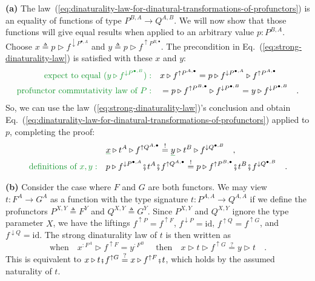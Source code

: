 \textbf{(a)} The law~(\ref{eq:dinaturality-law-for-dinatural-transformations-of-profunctors})
is an equality of functions of type $P^{B,A}\rightarrow Q^{A,B}$.
We will now show that those functions will give equal results when
applied to an arbitrary value $p:P^{B,A}$. Choose $x\triangleq p\triangleright f^{\downarrow P^{\bullet,A}}$
and $y\triangleq p\triangleright f^{\uparrow P^{B,\bullet}}$. The
precondition in Eq.~(\ref{eq:strong-dinaturality-law}) is satisfied
with these $x$ and $y$:
\begin{align*}
{\color{greenunder}\text{expect to equal }(y\triangleright f^{\downarrow P^{\bullet,B}}):}\quad & x\triangleright f^{\uparrow P^{A,\bullet}}=p\triangleright f^{\downarrow P^{\bullet,A}}\triangleright f^{\uparrow P^{A,\bullet}}\\
{\color{greenunder}\text{profunctor commutativity law of }P:}\quad & =p\triangleright f^{\uparrow P^{B,\bullet}}\triangleright f^{\downarrow P^{\bullet,B}}=y\triangleright f^{\downarrow P^{\bullet,B}}\quad.
\end{align*}
So, we can use the law~(\ref{eq:strong-dinaturality-law})\textsf{'}s conclusion
and obtain Eq.~(\ref{eq:dinaturality-law-for-dinatural-transformations-of-profunctors})
applied to $p$, completing the proof:
\begin{align*}
 & \gunderline x\triangleright t^{A}\triangleright f^{\uparrow Q^{A,\bullet}}\overset{!}{=}\gunderline y\triangleright t^{B}\triangleright f^{\downarrow Q^{\bullet,B}}\quad,\\
{\color{greenunder}\text{definitions of }x,y:}\quad & p\triangleright f^{\downarrow P^{\bullet,A}}\bef t^{A}\bef f^{\uparrow Q^{A,\bullet}}\overset{!}{=}p\triangleright f^{\uparrow P^{B,\bullet}}\bef t^{B}\bef f^{\downarrow Q^{\bullet,B}}\quad.
\end{align*}

\textbf{(b)} Consider the case where $F$ and $G$ are both functors.
We may view $t:F^{A}\rightarrow G^{A}$ as a function with the type
signature $t:P^{A,A}\rightarrow Q^{A,A}$ if we define the profunctors
$P^{X,Y}\triangleq F^{Y}$ and $Q^{X,Y}\triangleq G^{Y}$. Since $P^{X,Y}$
and $Q^{X,Y}$ ignore the type parameter $X$, we have the liftings
$f^{\uparrow P}=f^{\uparrow F}$, $f^{\downarrow P}=\text{id}$, $f^{\uparrow Q}=f^{\uparrow G}$,
and $f^{\downarrow Q}=\text{id}$. The strong dinaturality law of
$t$ is then written as
\[
\text{when}\quad x^{:F^{A}}\triangleright f^{\uparrow F}=y^{:F^{B}}\quad\text{ then}\quad x\triangleright t\triangleright f^{\uparrow G}\overset{?}{=}y\triangleright t\quad.
\]
This is equivalent to $x\triangleright t\bef f^{\uparrow G}\overset{?}{=}x\triangleright f^{\uparrow F}\bef t$,
which holds by the assumed naturality of $t$.

